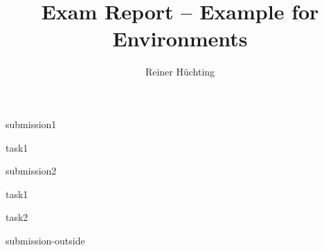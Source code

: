 \documentclass[a4paper]{scrartcl}
\begin{document}
    \title{Exam Report -- Example for Environments}
    \author{Reiner Hüchting}

    \maketitle

    \begin{examreport}[../submissions]
        \begin{submissionreport}{submission1}
            \begin{taskreport}{task1}
            \end{taskreport}
        \end{submissionreport}
        \begin{submissionreport}{submission2}
            \begin{taskreport}{task1}
            \end{taskreport}
            \begin{taskreport}{task2}
            \end{taskreport}
        \end{submissionreport}
    \end{examreport}

    \begin{submissionreport}{submission-outside}
    \end{submissionreport}
\end{document}
